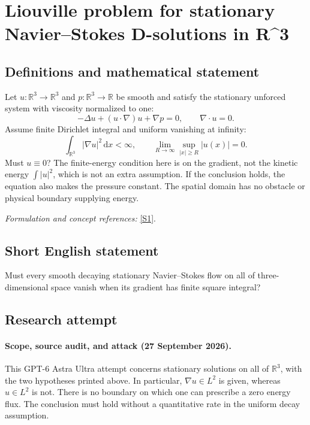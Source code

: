 \documentclass[11pt]{article}
\begin{document}
\section*{\texorpdfstring{Liouville problem for stationary Navier–Stokes D-solutions in R\textasciicircum{}3}{Liouville problem for stationary Navier–Stokes D-solutions in R\textasciicircum{}3}}\label{487}
\subsection{Definitions and mathematical statement}
Let $u:{\mathbb{R}}^3\to{\mathbb{R}}^3$ and $p:{\mathbb{R}}^3\to{\mathbb{R}}$ be smooth and satisfy the stationary unforced system with viscosity normalized to one:
\[
 -\Delta u+(u\cdot\nabla)u+\nabla p=0,
 \qquad\nabla\cdot u=0.
\]
Assume finite Dirichlet integral and uniform vanishing at infinity:
\[
 \int_{{\mathbb{R}}^3}|\nabla u|^2{\,\mathrm{d}} x<\infty,
 \qquad \lim_{R\to\infty}\sup_{|x|\ge R}|u(x)|=0.
\]
Must $u\equiv0$? The finite-energy condition here is on the gradient, not the kinetic energy $\int|u|^2$, which is not an extra assumption. If the conclusion holds, the equation also makes the pressure constant. The spatial domain has no obstacle or physical boundary supplying energy.
\par\smallskip\textit{Formulation and concept references:} \href{https://arxiv.org/html/2506.14533v1}{[S1]}.

\subsection{Short English statement}
Must every smooth decaying stationary Navier--Stokes flow on all of three-dimensional space vanish when its gradient has finite square integral?
\subsection{Research attempt}

\paragraph{Scope, source audit, and attack (27 September 2026).}
This GPT-6 Astra Ultra attempt concerns stationary solutions on all of
$\mathbb R^3$, with the two hypotheses printed above. In particular,
$\nabla u\in L^2$ is given, whereas $u\in L^2$ is not. There is no
boundary on which one can prescribe a zero energy flux. The conclusion
must hold without a quantitative rate in the uniform decay assumption.
\end{document}
